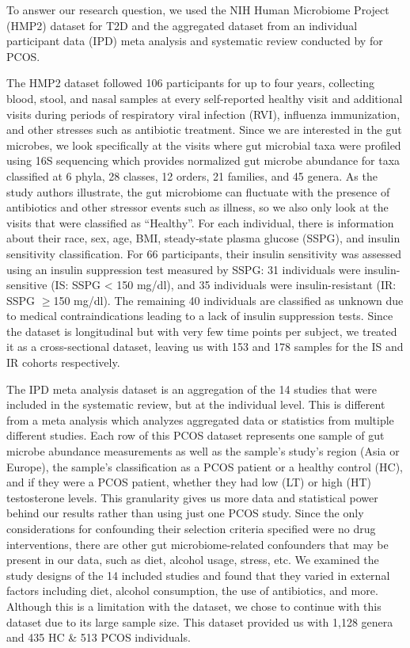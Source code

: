 \documentclass[12pt,letterpaper]{article}
\begin{document}
To answer our research question, we used the NIH Human Microbiome Project (HMP2) dataset \citep{zhou2019t2d} for T2D and the aggregated dataset from an individual participant data (IPD) meta analysis and systematic review conducted by \citep{yang2024pcos} for PCOS. 

The HMP2 dataset \citep{zhou2019t2d} followed 106 participants for up to four years, collecting blood, stool, and nasal samples at every self-reported healthy visit and additional visits during periods of respiratory viral infection (RVI), influenza immunization, and other stresses such as antibiotic treatment. Since we are interested in the gut microbes, we look specifically at the visits where gut microbial taxa were profiled using 16S sequencing which provides normalized gut microbe abundance for taxa classified at 6 phyla, 28 classes, 12 orders, 21 families, and 45 genera. As the study authors illustrate, the gut microbiome can fluctuate with the presence of antibiotics and other stressor events such as illness, so we also only look at the visits that were classified as “Healthy”. For each individual, there is information about their race, sex, age, BMI, steady-state plasma glucose (SSPG), and insulin sensitivity classification. For 66 participants, their insulin sensitivity was assessed using an insulin suppression test measured by SSPG: 31 individuals were insulin-sensitive (IS: SSPG < 150 mg/dl), and 35 individuals were insulin-resistant (IR: SSPG $\geq$150 mg/dl). The remaining 40 individuals are classified as unknown due to medical contraindications leading to a lack of insulin suppression tests. Since the dataset is longitudinal but with very few time points per subject, we treated it as a cross-sectional dataset, leaving us with 153 and 178 samples for the IS and IR cohorts respectively.

The IPD meta analysis dataset \citep{yang2024pcos} is an aggregation of the 14 studies that were included in the systematic review, but at the individual level. This is different from a meta analysis which analyzes aggregated data or statistics from multiple different studies. Each row of this PCOS dataset represents one sample of gut microbe abundance measurements as well as the sample’s study’s region (Asia or Europe), the sample’s classification as a PCOS patient or a healthy control (HC), and if they were a PCOS patient, whether they had low (LT) or high (HT) testosterone levels. This granularity gives us more data and statistical power behind our results rather than using just one PCOS study. Since the only considerations for confounding their selection criteria specified were no drug interventions, there are other gut microbiome-related confounders that may be present in our data, such as diet, alcohol usage, stress, etc. We examined the study designs of the 14 included studies and found that they varied in external factors including diet, alcohol consumption, the use of antibiotics, and more. Although this is a limitation with the dataset, we chose to continue with this dataset due to its large sample size. This dataset provided us with 1,128 genera and 435 HC \& 513 PCOS individuals. 
\end{document}
